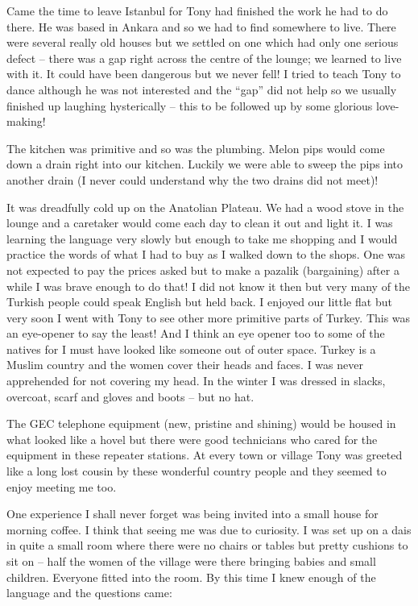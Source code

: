 Came the time to leave Istanbul for Tony had finished the work he had
to do there. He was based in Ankara and so we had to find somewhere to
live. There were several really old houses but we settled on one which
had only one serious defect -- there was a gap right across the centre
of the lounge; we learned to live with it. It could have been
dangerous but we never fell! I tried to teach Tony to dance although
he was not interested and the ``gap'' did not help so we usually
finished up laughing hysterically -- this to be followed up by some
glorious love-making!

The kitchen was primitive and so was the plumbing. Melon pips would
come down a drain right into our kitchen. Luckily we were able to
sweep the pips into another drain (I never could understand why the
two drains did not meet)!

It was dreadfully cold up on the Anatolian Plateau. We had a wood
stove in the lounge and a caretaker would come each day to clean it
out and light it. I was learning the language very slowly but enough
to take me shopping and I would practice the words of what I had to
buy as I walked down to the shops. One was not expected to pay the
prices asked but to make a pazalik (bargaining) after a while I was
brave enough to do that! I did not know it then but very many of the
Turkish people could speak English but held back. I enjoyed our little
flat but very soon I went with Tony to see other more primitive parts
of Turkey. This was an eye-opener to say the least! And I think an eye
opener too to some of the natives for I must have looked like someone
out of outer space. Turkey is a Muslim country and the women cover
their heads and faces. I was never apprehended for not covering my
head. In the winter I was dressed in slacks, overcoat, scarf and
gloves and boots -- but no hat.

The GEC telephone equipment (new, pristine and shining) would be
housed in what looked like a hovel but there were good technicians who
cared for the equipment in these repeater stations. At every town or
village Tony was greeted like a long lost cousin by these wonderful
country people and they seemed to enjoy meeting me too.

One experience I shall never forget was being invited into a small
house for morning coffee. I think that seeing me was due to
curiosity. I was set up on a dais in quite a small room where there
were no chairs or tables but pretty cushions to sit on -- half the
women of the village were there bringing babies and small
children. Everyone fitted into the room. By this time I knew enough of
the language and the questions came:

